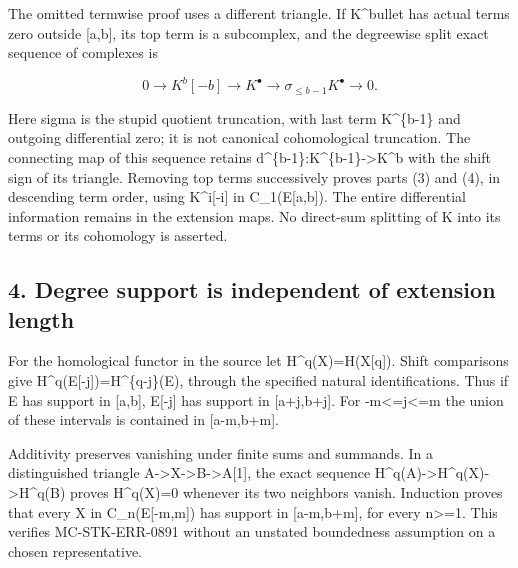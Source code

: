 \documentclass[11pt]{article}
\begin{document}
The omitted termwise proof uses a different triangle. If K\^{}bullet has actual terms zero outside [a,\allowbreak{}b]\allowbreak{},\allowbreak{} its top term is a subcomplex,\allowbreak{} and the degreewise split exact sequence of complexes is

\[
 0\longrightarrow K^b[-b]\longrightarrow K^\bullet
   \longrightarrow \sigma_{\leq b-1}K^\bullet\longrightarrow0.
\]

Here sigma is the stupid quotient truncation,\allowbreak{} with last term K\^{}\{b-1\} and outgoing differential zero; it is not canonical cohomological truncation. The connecting map of this sequence retains d\textasciicircum{}\{b-1\}:\allowbreak{}K\textasciicircum{}\{b-1\}\allowbreak{}->K\textasciicircum{}b with the shift sign of its triangle. Removing top terms successively proves parts (3)\allowbreak{} and (4)\allowbreak{},\allowbreak{} in descending term order,\allowbreak{} using K\textasciicircum{}i[-i]\allowbreak{} in C\_\allowbreak{}1(E[a,\allowbreak{}b]\allowbreak{})\allowbreak{}. The entire differential information remains in the extension maps. No direct-sum splitting of K into its terms or its cohomology is asserted.

\subsection{4. Degree support is independent of extension length}\label{proofs-10691-11108-degree-support-is-independent-of-extension-length}

For the homological functor in the source let H\textasciicircum{}q(X)\allowbreak{}\allowbreak{}=H(X[q]\allowbreak{})\allowbreak{}. Shift comparisons give H\textasciicircum{}q(E[-j]\allowbreak{})\allowbreak{}\allowbreak{}=H\textasciicircum{}\{q-j\}(E)\allowbreak{},\allowbreak{} through the specified natural identifications. Thus if E has support in [a,\allowbreak{}b]\allowbreak{},\allowbreak{} E[-j]\allowbreak{} has support in [a\allowbreak{}+j,\allowbreak{}b\allowbreak{}+j]\allowbreak{}. For -m<\allowbreak{}=j<\allowbreak{}=m the union of these intervals is contained in [a-m,\allowbreak{}b\allowbreak{}+m]\allowbreak{}.

Additivity preserves vanishing under finite sums and summands. In a distinguished triangle A\allowbreak{}->X\allowbreak{}->B\allowbreak{}->A[1]\allowbreak{},\allowbreak{} the exact sequence H\textasciicircum{}q(A)\allowbreak{}\allowbreak{}->H\textasciicircum{}q(X)\allowbreak{}\allowbreak{}->H\textasciicircum{}q(B)\allowbreak{} proves H\textasciicircum{}q(X)\allowbreak{}\allowbreak{}=0 whenever its two neighbors vanish. Induction proves that every X in C\_\allowbreak{}n(E[-m,\allowbreak{}m]\allowbreak{})\allowbreak{} has support in [a-m,\allowbreak{}b\allowbreak{}+m]\allowbreak{},\allowbreak{} for every n>\allowbreak{}=1. This verifies MC-STK-ERR-0891 without an unstated boundedness assumption on a chosen representative.
\end{document}
